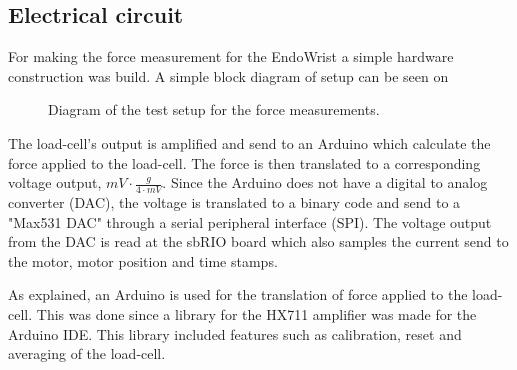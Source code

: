 \subsection*{Electrical circuit}
For making the force measurement for the EndoWrist a simple hardware construction was build. A simple block diagram of setup can be seen on 

\begin{figure}[H]
\centering
{}
\caption{Diagram of the test setup for the force measurements.}
\label{fig:arduino_loadcell}
\end{figure}

The load-cell's output is amplified and send to an Arduino which calculate the force applied to the load-cell. The force is then translated to a corresponding voltage output, $mV\cdot\frac{g}{4\cdot mV}$. Since the Arduino does not have a digital to analog converter (DAC), the voltage is translated to a binary code and send to a "Max531 DAC" through a serial peripheral interface (SPI). The voltage output from the DAC is read at the sbRIO board which also samples the current send to the motor, motor position and time stamps.

As explained, an Arduino is used for the translation of force applied to the load-cell. This was done since a library for the HX711 amplifier was made for the Arduino IDE\cite{Git_HX711}. This library included features such as calibration, reset and averaging of the load-cell. 



